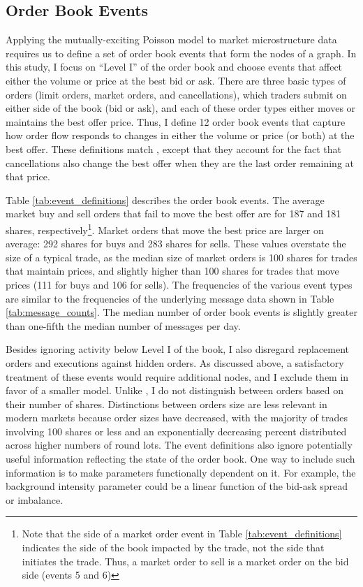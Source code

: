 	\subsection{Order Book Events}
		Applying the mutually-exciting Poisson model to market microstructure data requires us to define a set of order book events that form the nodes of a graph. In this study, I focus on ``Level I'' of the order book and choose events that affect either the volume or price at the best bid or ask. There are three basic types of orders (limit orders, market orders, and cancellations), which traders submit on either side of the book (bid or ask), and each of these order types either moves or maintains the best offer price. Thus, I define 12 order book events that capture how order flow responds to changes in either the volume or price (or both) at the best offer. These definitions match \cite{Large2007}, except that they account for the fact that cancellations also change the best offer when they are the last order remaining at that price.

		Table \ref{tab:event_definitions} describes the order book events. The average market buy and sell orders that fail to move the best offer are for 187 and 181 shares, respectively\footnote{Note that the side of a market order event in Table \ref{tab:event_definitions} indicates the side of the book impacted by the trade, not the side that initiates the trade. Thus, a market order to sell is a market order on the bid side (events 5 and 6)}. Market orders that move the best price are larger on average: 292 shares for buys and 283 shares for sells. These values overstate the size of a typical trade, as the median size of market orders is 100 shares for trades that maintain prices, and slightly higher than 100 shares for trades that move prices (111 for buys and 106 for sells). The frequencies of the various event types are similar to the frequencies of the underlying message data shown in Table \ref{tab:message_counts}. The median number of order book events is slightly greater than one-fifth the median number of messages per day.

		Besides ignoring activity below Level I of the book, I also disregard replacement orders and executions against hidden orders. As discussed above, a satisfactory treatment of these events would require additional nodes, and I exclude them in favor of a smaller model. Unlike \cite{Biais1995}, I do not distinguish between orders based on their number of shares. Distinctions between orders size are less relevant in modern markets because order sizes have decreased, with the majority of trades involving 100 shares or less and an exponentially decreasing percent distributed across higher numbers of round lots. The event definitions also ignore potentially useful information reflecting the state of the order book. One way to include such information is to make parameters functionally dependent on it. For example, the background intensity parameter could be a linear function of the bid-ask spread or imbalance.

